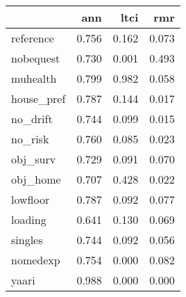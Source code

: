 \begin{tabular}{lrrr}
\toprule
{} &    ann &   ltci &    rmr \\
\midrule
reference  &  0.756 &  0.162 &  0.073 \\
nobequest  &  0.730 &  0.001 &  0.493 \\
muhealth   &  0.799 &  0.982 &  0.058 \\
house\_pref &  0.787 &  0.144 &  0.017 \\
no\_drift   &  0.744 &  0.099 &  0.015 \\
no\_risk    &  0.760 &  0.085 &  0.023 \\
obj\_surv   &  0.729 &  0.091 &  0.070 \\
obj\_home   &  0.707 &  0.428 &  0.022 \\
lowfloor   &  0.787 &  0.092 &  0.077 \\
loading    &  0.641 &  0.130 &  0.069 \\
singles    &  0.744 &  0.092 &  0.056 \\
nomedexp   &  0.754 &  0.000 &  0.082 \\
yaari      &  0.988 &  0.000 &  0.000 \\
\bottomrule
\end{tabular}
